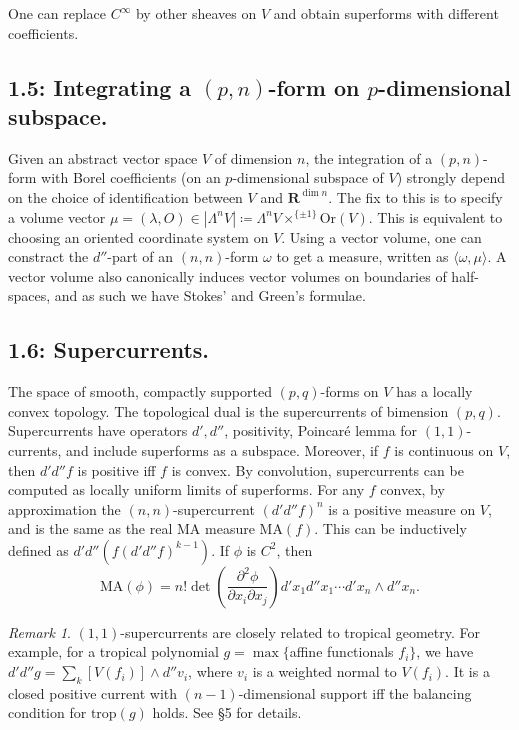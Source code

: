 \documentclass[12pt,reqno]{amsart}
\theoremstyle{definition}
\theoremstyle{remark}
\newtheorem{remark}[theorem]{Remark}
\theoremstyle{citedrem}
\theoremstyle{cited}
\theoremstyle{citeddef}
\theoremstyle{step}
\newcommand{\MA}{\mathrm{MA}}
\begin{document}
One can replace $C^\infty$ by other sheaves on $V$ and obtain superforms with different coefficients. 

\subsection*{1.5: Integrating a $(p,n)$-form on $p$-dimensional subspace.} Given an abstract vector space $V$ of dimension $n$, the integration of a $(p,n)$-form with Borel coefficients (on an $p$-dimensional subspace of $V$) strongly depend on the choice of identification between $V$ and $\mathbf{R}^{\dim n}$. The fix to this is to specify a volume vector $\mu = (\lambda, O) \in |\Lambda^n V| \coloneqq \Lambda^n V \times^{\{\pm 1\}} \mathrm{Or}(V)$. This is equivalent to choosing an oriented coordinate system on $V$. Using a vector volume, one can constract the $d''$-part of an $(n,n)$-form $\omega$ to get a measure, written as $\langle \omega, \mu \rangle$. A vector volume also canonically induces vector volumes on boundaries of half-spaces, and as such we have Stokes' and Green's formulae. 


\subsection*{1.6: Supercurrents.} The space of smooth, compactly supported $(p,q)$-forms on $V$ has a locally convex topology. The topological dual is the supercurrents of bimension $(p,q)$. Supercurrents have operators $d',d''$, positivity, Poincar\'{e} lemma for $(1,1)$-currents, and include superforms as a subspace. Moreover, if $f$ is continuous on $V$, then $d'd''f$ is positive iff $f$ is convex. By convolution, supercurrents can be computed as locally uniform limits of superforms. For any $f$ convex, by approximation the $(n,n)$-supercurrent $(d'd''f)^n$ is a positive measure on $V$, and is the same as the real MA measure $\MA(f)$. This can be inductively defined as $d'd''(f (d' d''f)^{k-1}).$ If $\phi$ is $C^2$, then \[\MA(\phi) = n!\det(\frac{\partial^2 \phi}{\partial x_i \partial x_j}) d'x_1 d''x_1 \cdots d'x_n \wedge d''x_n.\]

\begin{remark}
    $(1,1)$-supercurrents are closely related to tropical geometry. For example, for a tropical polynomial $g = \max\{$affine functionals $f_i \}$, we have $d'd''g = \sum_k [V(f_i)] \wedge d''v_i$, where $v_i$ is a weighted normal to $V(f_i)$. It is a closed positive current with $(n-1)$-dimensional support iff the balancing condition for $\mathrm{trop}(g)$ holds. See \cite{Lag12} \S 5 for details. 
\end{remark}
\end{document}
